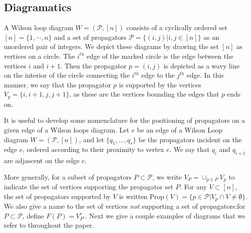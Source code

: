 \documentclass[11pt]{article}
\newcommand{\cP}{\mathcal{P}}
\newcommand{\Prop}{\textrm{Prop}}
\theoremstyle{remark}
\theoremstyle{definition}
\begin{document}
\subsection{Diagramatics \label{sec:diagramdefs}}
A Wilson loop diagram $W = (\cP, [n])$ consists of a cyclically ordered set $[n] = \{1, \cdots, n\}$ and a set of propagators $\cP = \{(i,j) | i, j \in [n]\}$ as an unordered pair of integers. We depict these diagrams by drawing the set $[n]$ as vertices on a circle. The $i^{th}$ edge of the marked circle is the edge between the vertices $i$ and $i+1$. Then the propagator $p =(i,j)$ is depicted as a wavy line on the interior of the circle connecting the $i^{th}$ edge to the $j^{th}$ edge. In this manner, we say that the propagator $p$ is supported by the vertices $V_p = \{i, i+1, j, j+1\}$, as these are the vertices bounding the edges that $p$ ends on. 

It is useful to develop some nomenclature for the positioning of propagators on a given edge of a Wilson loops diagram.  Let $e$ be an edge of a Wilson Loop diagram $W = (\cP, [n])$, and  let $\{q_1, \ldots, q_s \}$ be the propagators incident on the edge $e$, ordered according to their proximity to vertex $e$. We say that $q_i$ and $q_{i+1}$ are adjascent on the edge $e$.

More generally, for a subset of propagators $P \subset \cP$, we write $V_P = \cup_{p \in P} V_p$ to indicate the set of vertices supporting the propagator set $P$. For any $V \subset [n]$, the set of propagators supported by $V$ is written $\Prop(V) = \{ p \in \cP | V_p \cap V \neq \emptyset\}$.  We also give a name to the set of vertices \emph{not} supporting a set of propagators:for $P \subset \cP$, define $F(P) = V_{P^c}^c$. Next we give a couple examples of diagrams that we refer to throughout the paper.
\end{document}
